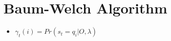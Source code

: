 \section{Baum-Welch Algorithm}
\begin{frame}

\begin{itemize}
	\item $\gamma_t(i) = Pr(s_t = q_i \vert O, \lambda)$ \\


\end{itemize}


\end{frame}








\begin{frame}

\end{frame}















